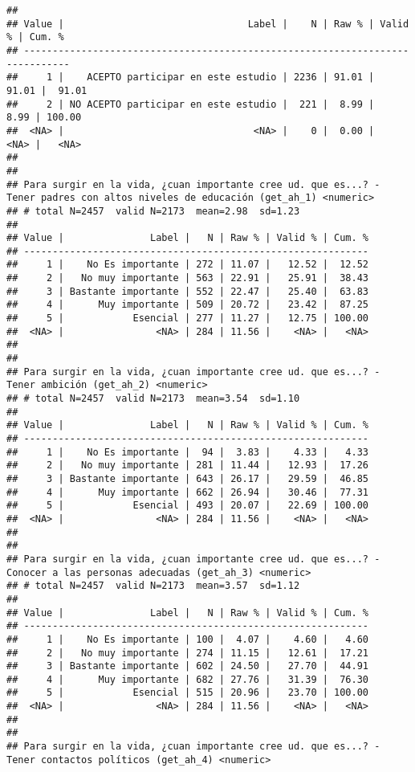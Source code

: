 \documentclass[
  10,
  landscape,
  legalpaper]{article}
\begin{document}
\begin{verbatim}
## 
## Value |                                Label |    N | Raw % | Valid % | Cum. %
## ------------------------------------------------------------------------------
##     1 |    ACEPTO participar en este estudio | 2236 | 91.01 |   91.01 |  91.01
##     2 | NO ACEPTO participar en este estudio |  221 |  8.99 |    8.99 | 100.00
##  <NA> |                                 <NA> |    0 |  0.00 |    <NA> |   <NA>
## 
## 
## Para surgir en la vida, ¿cuan importante cree ud. que es...? - Tener padres con altos niveles de educación (get_ah_1) <numeric>
## # total N=2457  valid N=2173  mean=2.98  sd=1.23
## 
## Value |               Label |   N | Raw % | Valid % | Cum. %
## ------------------------------------------------------------
##     1 |    No Es importante | 272 | 11.07 |   12.52 |  12.52
##     2 |   No muy importante | 563 | 22.91 |   25.91 |  38.43
##     3 | Bastante importante | 552 | 22.47 |   25.40 |  63.83
##     4 |      Muy importante | 509 | 20.72 |   23.42 |  87.25
##     5 |            Esencial | 277 | 11.27 |   12.75 | 100.00
##  <NA> |                <NA> | 284 | 11.56 |    <NA> |   <NA>
## 
## 
## Para surgir en la vida, ¿cuan importante cree ud. que es...? - Tener ambición (get_ah_2) <numeric>
## # total N=2457  valid N=2173  mean=3.54  sd=1.10
## 
## Value |               Label |   N | Raw % | Valid % | Cum. %
## ------------------------------------------------------------
##     1 |    No Es importante |  94 |  3.83 |    4.33 |   4.33
##     2 |   No muy importante | 281 | 11.44 |   12.93 |  17.26
##     3 | Bastante importante | 643 | 26.17 |   29.59 |  46.85
##     4 |      Muy importante | 662 | 26.94 |   30.46 |  77.31
##     5 |            Esencial | 493 | 20.07 |   22.69 | 100.00
##  <NA> |                <NA> | 284 | 11.56 |    <NA> |   <NA>
## 
## 
## Para surgir en la vida, ¿cuan importante cree ud. que es...? - Conocer a las personas adecuadas (get_ah_3) <numeric>
## # total N=2457  valid N=2173  mean=3.57  sd=1.12
## 
## Value |               Label |   N | Raw % | Valid % | Cum. %
## ------------------------------------------------------------
##     1 |    No Es importante | 100 |  4.07 |    4.60 |   4.60
##     2 |   No muy importante | 274 | 11.15 |   12.61 |  17.21
##     3 | Bastante importante | 602 | 24.50 |   27.70 |  44.91
##     4 |      Muy importante | 682 | 27.76 |   31.39 |  76.30
##     5 |            Esencial | 515 | 20.96 |   23.70 | 100.00
##  <NA> |                <NA> | 284 | 11.56 |    <NA> |   <NA>
## 
## 
## Para surgir en la vida, ¿cuan importante cree ud. que es...? - Tener contactos políticos (get_ah_4) <numeric>

\end{verbatim}
\end{document}
